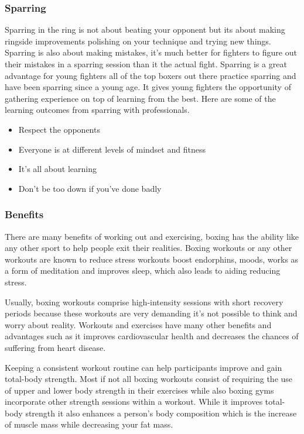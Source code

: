 \documentclass[a4paper,12pt]{report}
\begin{document}
\subsubsection{Sparring}
Sparring in the ring is not about beating your opponent but its about making ringside improvements polishing on your technique and trying new things. Sparring is also about making mistakes, it's much better for fighters to figure out their mistakes in a sparring session than it the actual fight.  
Sparring is a great advantage for young fighters all of the top boxers out there practice sparring and have been sparring since a young age. It gives young fighters the opportunity of gathering experience on top of learning from the best. 
Here are some of the learning outcomes from sparring with professionals.\cite{sparringWorkout}
\begin{itemize}
    \item Respect the opponents
    \item Everyone is at different levels of mindset and fitness
    \item It’s all about learning
    \item Don’t be too down if you’ve done badly
\end{itemize}

\subsubsection{Benefits}
There are many benefits of working out and exercising, boxing has the ability like any other sport to help people exit their realities. Boxing workouts or any other workouts are known to reduce stress workouts boost endorphins, moods, works as a form of meditation and improves sleep, which also leads to aiding reducing stress.

Usually, boxing workouts comprise high-intensity sessions with short recovery periods because these workouts are very demanding it's not possible to think and worry about reality. Workouts and exercises have many other benefits and advantages such as it improves cardiovascular health and decreases the chances of suffering from heart disease.

Keeping a consistent workout routine can help participants improve and gain total-body strength. Most if not all boxing workouts consist of requiring the use of upper and lower body strength in their exercises while also boxing gyms incorporate other strength sessions within a workout. While it improves total-body strength it also enhances a person's body composition which is the increase of muscle mass while decreasing your fat mass.\cite{workoutBenifits}   
\end{document}
